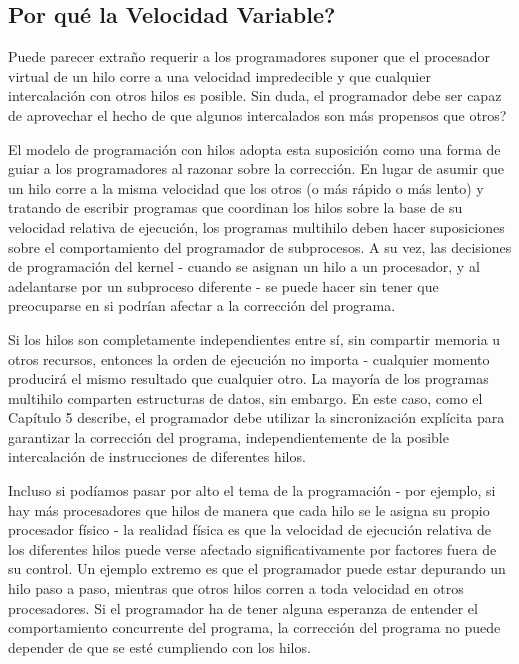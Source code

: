 \documentclass[10pt]{book}
\begin{document}
\subsection{Por qué la Velocidad Variable?}
Puede parecer extraño requerir a los programadores suponer que el procesador virtual de un hilo corre a una velocidad impredecible y que cualquier intercalación con otros hilos es posible. Sin duda, el programador debe ser capaz de aprovechar el hecho de que algunos intercalados son más propensos que otros?

El modelo de programación con hilos adopta esta suposición como una forma de guiar a los programadores al razonar sobre la corrección. En lugar de asumir que un hilo corre a la misma velocidad que los otros (o más rápido o más lento) y tratando de escribir programas que coordinan los hilos sobre la base de su velocidad relativa de ejecución, los programas multihilo deben hacer suposiciones sobre el comportamiento del programador de subprocesos. A su vez, las decisiones de programación del kernel - cuando se asignan un hilo a un procesador, y al adelantarse por un subproceso diferente - se puede hacer sin tener que preocuparse en si podrían afectar a la corrección del programa.

Si los hilos son completamente independientes entre sí, sin compartir memoria u otros recursos, entonces la orden de ejecución no importa - cualquier momento producirá el mismo resultado que cualquier otro. La mayoría de los programas multihilo comparten estructuras de datos, sin embargo. En este caso, como el Capítulo 5 describe, el programador debe utilizar la sincronización explícita para garantizar la corrección del programa, independientemente de la posible intercalación de instrucciones de diferentes hilos.

Incluso si podíamos pasar por alto el tema de la programación - por ejemplo, si hay más procesadores que hilos de manera que cada hilo se le asigna su propio procesador físico - la realidad física es que la velocidad de ejecución relativa de los diferentes hilos puede verse afectado significativamente por factores fuera de su control. Un ejemplo extremo es que el programador puede estar depurando un hilo paso a paso, mientras que otros hilos corren a toda velocidad en otros procesadores. Si el programador ha de tener alguna esperanza de entender el comportamiento concurrente del programa, la corrección del programa no puede depender de que se esté cumpliendo con los hilos.
\end{document}
